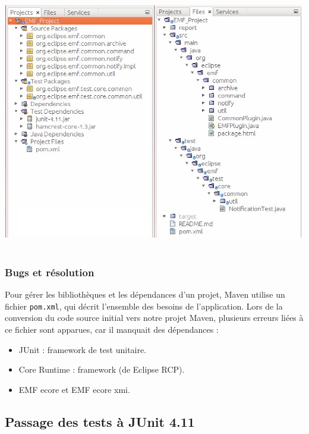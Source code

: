 \documentclass[a4paper]{article}
\begin{document}
		\begin{center}
			\includegraphics[width=1.0\textwidth]{Arborescence.jpg}~\\
		\end{center}

		\vspace{0.5cm}

		\subsubsection{Bugs et résolution}

		\vspace{0.5cm}

		Pour gérer les bibliothèques et les dépendances d'un projet, Maven utilise un fichier \texttt{pom.xml}, qui décrit l'ensemble des besoins de l'application. Lors de la conversion du code source initial vers notre projet Maven, plusieurs erreurs liées à ce fichier sont apparues, car il manquait des dépendances :
		\begin{itemize}
			\item JUnit : framework de test unitaire.
			\item Core Runtime : framework (de Eclipse RCP).
			\item EMF ecore et EMF ecore xmi.
		\end{itemize}

		\vspace{0.5cm}



		\subsection{Passage des tests à JUnit 4.11}
\end{document}
